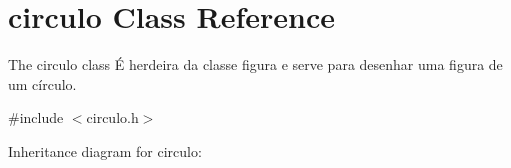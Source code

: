 \hypertarget{classcirculo}{}\section{circulo Class Reference}
\label{classcirculo}


The circulo class É herdeira da classe figura e serve para desenhar uma figura de um círculo.  




{\ttfamily \#include $<$circulo.\+h$>$}



Inheritance diagram for circulo\+:
